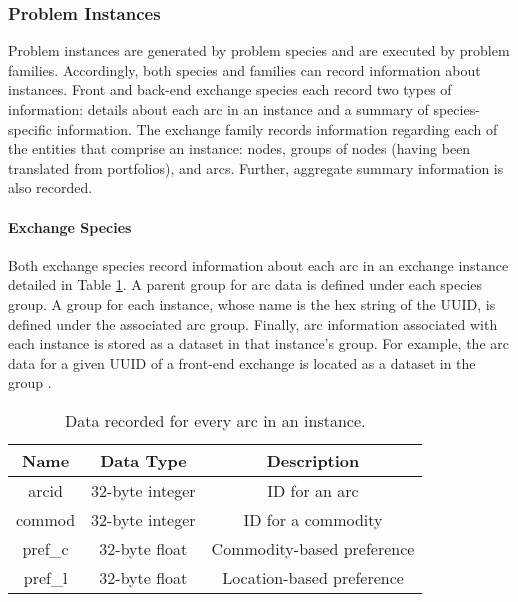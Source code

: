 
\subsubsection{Problem Instances}

Problem instances are generated by problem species and are executed by problem
families. Accordingly, both species and families can record information about
instances. Front and back-end exchange species each record two types of
information: details about each arc in an instance and a summary of
species-specific information. The exchange family records information regarding
each of the entities that comprise an instance: nodes, groups of nodes (having
been translated from portfolios), and arcs. Further, aggregate summary
information is also recorded. 

\paragraph{Exchange Species}

Both exchange species record information about each arc in an exchange instance
detailed in Table \ref{tbl:sp_inst_arc}. A parent group for arc data is defined
under each species group. A group for each instance, whose name is the hex
string of the UUID, is defined under the associated arc group. Finally, arc
information associated with each instance is stored as a dataset in that
instance's group. For example, the arc data for a given UUID of a front-end
exchange is located as a dataset in the group
.

\begin{table}[]
\centering
\label{tbl:sp_inst_arc}
\caption{Data recorded for every arc in an instance.}
\begin{tabular}{|c|c|c|}
\hline
\textbf{Name} & \textbf{Data Type} & \textbf{Description}       \\ \hline
arcid         & 32-byte integer    & ID for an arc              \\ \hline
commod        & 32-byte integer    & ID for a commodity         \\ \hline
pref\_c       & 32-byte float      & Commodity-based preference \\ \hline
pref\_l       & 32-byte float      & Location-based preference  \\ \hline
\end{tabular}
\end{table}

